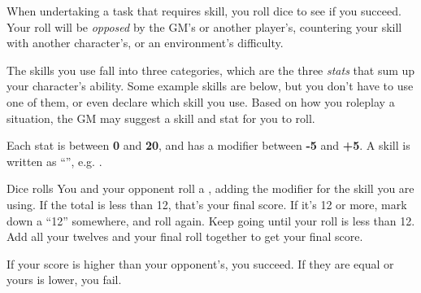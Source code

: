 
When undertaking a task that requires skill, you roll dice to see if you succeed. Your roll will be \emph{opposed} by the GM's or another player's, countering your skill with another character's, or an environment's difficulty.

The skills you use fall into three categories, which are the three \emph{stats} that sum up your character's ability. Some example skills are below, but you don't have to use one of them, or even declare which skill you use. Based on how you roleplay a situation, the GM may suggest a skill and stat for you to roll.



Each stat is between \textbf{0} and \textbf{20}, and has a modifier between \textbf{-5} and \textbf{+5}. A skill is written as ``'', e.g. .

\begin{abstractsection}{Dice rolls}
You and your opponent roll a , adding the modifier for the skill you are using. If the total is less than 12, that's your final score. If it's 12 or more, mark down a ``12'' somewhere, and roll again. Keep going until your roll is less than 12. Add all your twelves and your final roll together to get your final score.

If your score is higher than your opponent's, you succeed. If they are equal or yours is lower, you fail.
\end{abstractsection}
